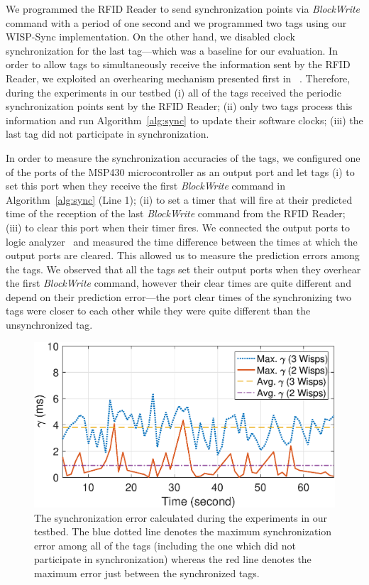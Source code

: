 \documentclass[journal,draftcls,onecolumn,12pt,twoside]{IEEEtranTCOM}
\begin{document}
We programmed the RFID Reader to send synchronization points via \emph{BlockWrite} command with a period of one second and we programmed two tags using our WISP-Sync implementation. On the other hand, we disabled clock synchronization for the last tag---which was a baseline for our evaluation.  In order to allow tags to simultaneously receive the information sent by the RFID Reader, we exploited an overhearing mechanism presented first in ~\cite[Section III-B]{stork:2017}. Therefore, during the experiments in our testbed (i) all of the tags received the periodic synchronization points sent by the RFID Reader; (ii) only two tags process this information and run Algorithm~\ref{alg:sync} to update their software clocks; (iii) the last tag did not participate in synchronization.

In order to measure the synchronization accuracies of the tags, we configured one of the ports of the MSP430 microcontroller as an output port and let tags (i) to set this port when they receive the first \emph{BlockWrite} command in Algorithm~\ref{alg:sync} (Line 1); (ii) to set a timer that will fire at their predicted time of the reception of the last \emph{BlockWrite} command from the RFID Reader; (iii) to clear this port when their timer fires. We connected the output ports to logic analyzer~\cite{saleae} and measured the time difference between the times at which the output ports are cleared. This allowed us to measure the prediction errors among the tags. We observed that all the tags set their output ports when they overhear the first \emph{BlockWrite} command, however their clear times are quite different and depend on their prediction error---the port clear times of the synchronizing two tags were closer to each other while they were quite different than the unsynchronized tag.

\begin{figure}
\centering
\includegraphics[scale=0.35]{figures/multiwisp-experiments.eps}
\caption{\label{fig:multi-sync-results}The synchronization error calculated during the experiments in our testbed. The blue dotted line denotes the maximum synchronization error among all of the tags (including the one which did not participate in synchronization) whereas the red line denotes the maximum error just between the synchronized tags.} 
\end{figure}
\end{document}
